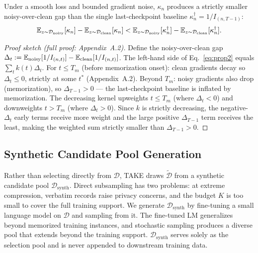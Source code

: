\begin{foldable}
  \begin{proposition} \label{prop:traj}
    Under a smooth loss and bounded gradient noise, $\kappa_n$ produces a strictly smaller noisy-over-clean gap than the single last-checkpoint baseline $\kappa^\dagger_n = 1/I_{(n,T-1)}$:
    \begin{equation}
      \mathbb{E}_{z \sim \mathcal{D}_\textup{noisy}}[\kappa_n] - \mathbb{E}_{z \sim \mathcal{D}_\textup{clean}}[\kappa_n]
      < \mathbb{E}_{z \sim \mathcal{D}_\textup{noisy}}[\kappa^\dagger_n] - \mathbb{E}_{z \sim \mathcal{D}_\textup{clean}}[\kappa^\dagger_n].
      \label{eq:prop2}
    \end{equation}
  \end{proposition}
  \begin{proof}[Proof sketch (full proof: Appendix~A.2)]
    Define the noisy-over-clean gap $\Delta_t := \mathbb{E}_\textup{noisy}[1/I_{(n,t)}] - \mathbb{E}_\textup{clean}[1/I_{(n,t)}]$.
    The left-hand side of Eq.~\ref{eq:prop2} equals $\sum_t k(t)\Delta_t$.
    For $t \leq T_m$ (before memorization onset): clean gradients decay so $\Delta_t \leq 0$, strictly at some $t^*$ (Appendix~A.2).
    Beyond $T_m$: noisy gradients also drop (memorization), so $\Delta_{T-1} > 0$ — the last-checkpoint baseline is inflated by memorization.
    The decreasing kernel upweights $t \leq T_m$ (where $\Delta_t < 0$) and downweights $t > T_m$ (where $\Delta_t > 0$).
    Since $k$ is strictly decreasing, the negative-$\Delta_t$ early terms receive more weight and the large positive $\Delta_{T-1}$ term receives the least, making the weighted sum strictly smaller than $\Delta_{T-1} > 0$.
  \end{proof}
\end{foldable}

\subsection{Synthetic Candidate Pool Generation} \label{sec:04-method-pool}
\begin{foldable} %
  Rather than selecting directly from $\mathcal{D}$, TAKE draws $\tilde{\mathcal{D}}$ from a synthetic candidate pool $\mathcal{D}_\text{synth}$.
  Direct subsampling has two problems: at extreme compression, verbatim records raise privacy concerns, and the budget $K$ is too small to cover the full training support.
  We generate $\mathcal{D}_\text{synth}$ by fine-tuning a small language model on $\mathcal{D}$ and sampling from it.
  The fine-tuned LM generalizes beyond memorized training instances, and stochastic sampling produces a diverse pool that extends beyond the training support.
  $\mathcal{D}_\text{synth}$ serves solely as the selection pool and is never appended to downstream training data.
\end{foldable}

